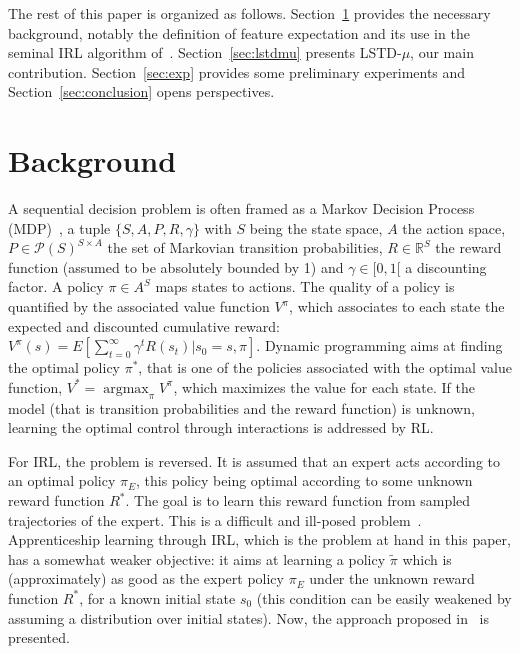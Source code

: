\documentclass{llncs}
\newcommand{\argmax}{\operatorname*{argmax}} %
\begin{document}
The rest of this paper is organized as follows.
Section~\ref{sec:back} provides the necessary background,
notably the definition of feature expectation and its use in the
seminal IRL algorithm of~\citet{abbeel2004apprenticeship}.
Section~\ref{sec:lstdmu} presents LSTD-$\mu$, our main contribution.
Section~\ref{sec:exp} provides some preliminary experiments and
Section~\ref{sec:conclusion} opens perspectives.


\section{Background}
\label{sec:back}
A sequential decision problem is often framed as a Markov Decision
Process (MDP)~\citep{sutton1998reinforcement}, a tuple
$\{S,A,P,R,\gamma\}$ with $S$ being the state space, $A$ the action
space, $P\in\mathcal{P}(S)^{S\times A}$ the set of Markovian
transition probabilities, $R\in\mathbb{R}^S$ the reward function
(assumed to be absolutely bounded by 1) and $\gamma\in[0,1[$ a
discounting factor. A policy $\pi\in A^S$ maps states to actions. The
quality of a policy is quantified by the associated value function
$V^\pi$, which associates to each state the expected and discounted
cumulative reward: $V^\pi(s) = E[\sum\limits_{t=0}^\infty \gamma^t R(s_t)|s_0=s, \pi]$.
Dynamic programming aims at finding the optimal policy $\pi^*$, that
is one of the policies associated with the optimal value function,
$V^* = \argmax_\pi V^\pi$, which maximizes the value for each state.
If the model (that is transition probabilities and the reward
function) is unknown, learning the optimal control through
interactions is addressed by RL.

For IRL, the problem is reversed. It is
assumed that an expert acts according to an optimal policy $\pi_E$,
this policy being optimal according to some unknown reward function
$R^*$. The goal is to learn this
reward function from sampled trajectories of the expert. This is a
difficult and ill-posed problem~\citep{ng2000algorithms}. Apprenticeship
learning through IRL, which is the problem at hand in this paper,
has a somewhat weaker objective: it aims at learning a policy
$\tilde{\pi}$ which is (approximately) as good as the expert policy
$\pi_E$ under the unknown reward function $R^*$, for a known initial
state $s_0$ (this condition can be easily weakened by assuming a
distribution over initial states). Now, the approach proposed in~\citep{abbeel2004apprenticeship} is
presented.
\end{document}
